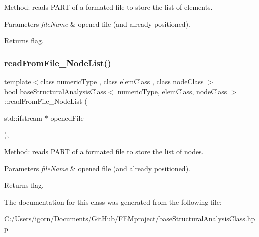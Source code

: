 Method\+: reads P\+A\+RT of a formated file to store the list of elements. 
\begin{DoxyParams}{Parameters}
{\em file\+Name} & opened file (and already positioned). \\
\hline
\end{DoxyParams}
\begin{DoxyReturn}{Returns}
flag. 
\end{DoxyReturn}
\mbox{\label{classbase_structural_analysis_class_ad81d20f7c98e21692e68db5019d0e8ae}} 
\subsubsection{\texorpdfstring{read\+From\+File\+\_\+\+Node\+List()}{readFromFile\_NodeList()}}
{\footnotesize\ttfamily template$<$class numeric\+Type , class elem\+Class , class node\+Class $>$ \\
bool \mbox{\hyperlink{classbase_structural_analysis_class}{base\+Structural\+Analysis\+Class}}$<$ numeric\+Type, elem\+Class, node\+Class $>$\+::read\+From\+File\+\_\+\+Node\+List (\begin{DoxyParamCaption}\item[{std\+::ifstream $\ast$}]{opened\+File }\end{DoxyParamCaption})\hspace{0.3cm}{\ttfamily [protected]}, {\ttfamily [virtual]}}

Method\+: reads P\+A\+RT of a formated file to store the list of nodes. 
\begin{DoxyParams}{Parameters}
{\em file\+Name} & opened file (and already positioned). \\
\hline
\end{DoxyParams}
\begin{DoxyReturn}{Returns}
flag. 
\end{DoxyReturn}


The documentation for this class was generated from the following file\+:\begin{DoxyCompactItemize}
\item 
C\+:/\+Users/igorn/\+Documents/\+Git\+Hub/\+F\+E\+Mproject/base\+Structural\+Analysis\+Class.\+hpp\end{DoxyCompactItemize}
